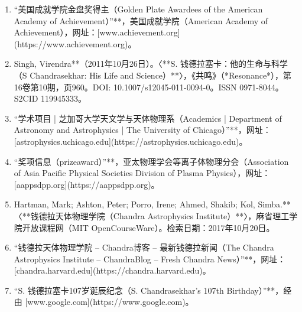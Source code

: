 \begin{enumerate}
\item “美国成就学院金盘奖得主（Golden Plate Awardees of the American Academy of Achievement）”**，美国成就学院（American Academy of Achievement），网址：[www.achievement.org](https://www.achievement.org)。

\item Singh, Virendra**（2011年10月26日）。〈**S. 钱德拉塞卡：他的生命与科学（S Chandrasekhar: His Life and Science）**〉，《共鸣》（*Resonance*），第16卷第10期，页960。DOI: 10.1007/s12045-011-0094-0。ISSN 0971-8044。S2CID 119945333。

\item “学术项目 | 芝加哥大学天文学与天体物理系（Academics | Department of Astronomy and Astrophysics | The University of Chicago）”**，网址：[astrophysics.uchicago.edu](https://astrophysics.uchicago.edu)。

\item “奖项信息（prizeaward）”**，亚太物理学会等离子体物理分会（Association of Asia Pacific Physical Societies Division of Plasma Physics），网址：[aappsdpp.org](https://aappsdpp.org)。

\item Hartman, Mark; Ashton, Peter; Porro, Irene; Ahmed, Shakib; Kol, Simba.**〈**钱德拉天体物理学院（Chandra Astrophysics Institute）**〉，麻省理工学院开放课程网（MIT OpenCourseWare）。检索日期：2017年10月20日。

\item “钱德拉天体物理学院 – Chandra博客 – 最新钱德拉新闻（The Chandra Astrophysics Institute – ChandraBlog – Fresh Chandra News）”**，网址：[chandra.harvard.edu](https://chandra.harvard.edu)。

\item “S. 钱德拉塞卡107岁诞辰纪念（S. Chandrasekhar's 107th Birthday）”**，经由 [www.google.com](https://www.google.com)。


\end{enumerate}
